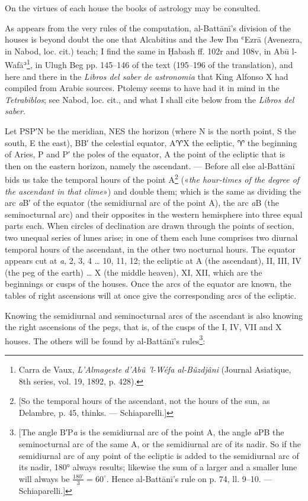 \documentclass[11pt]{article}
\begin{document}
\par On the virtues of each house the books of astrology may be consulted.\par
\par As appears from the very rules of the computation, al-Battānī's division of the houses is beyond doubt the one that Alcabitius and the Jew Ibn ʿEzrā (Avenezra, in Nabod, loc. cit.) teach; I find the same in Ḥabash ff. 102r and 108v, in Abū l-Wafāʾ\footnote{Carra de Vaux, \emph{L’Almageste d’Abû ’l-Wéfa al-Bûzdjâni} (Journal Asiatique, 8th series, vol. 19, 1892, p. 428).}, in Ulugh Beg pp. 145–146 of the text (195–196 of the translation), and here and there in the \emph{Libros del saber de astronomia} that King Alfonso X had compiled from Arabic sources. Ptolemy seems to have had it in mind in the \emph{Tetrabiblos}; see Nabod, loc. cit., and what I shall cite below from the \emph{Libros del saber}.\par
\begin{center}\end{center}
\par Let PSP′N be the meridian, NES the horizon (where N is the north point, S the south, E the east), BB′ the celestial equator, A{\MoonFont\upshape ♈}X the ecliptic, {\MoonFont\upshape ♈} the beginning of Aries, P and P′ the poles of the equator, A the point of the ecliptic that is then on the eastern horizon, namely the ascendant. — Before all else al-Battānī bids us take the temporal hours of the point A\footnote{[So the temporal hours of the ascendant, not the hours of the sun, as Delambre, p. 45, thinks. — Schiaparelli.]} («\emph{the hour-times of the degree of the ascendant in that clime}») and double them; which is the same as dividing the arc \emph{a}B′ of the equator (the semidiurnal arc of the point A), the arc \emph{a}B (the seminocturnal arc) and their opposites in the western hemisphere into three equal parts each. When circles of declination are drawn through the points of section, two unequal series of lunes arise; in one of them each lune comprises two diurnal temporal hours of the ascendant, in the other two nocturnal hours. The equator appears cut at \emph{a}, 2, 3, 4 … 10, 11, 12; the ecliptic at A (the ascendant), II, III, IV (the peg of the earth) … X (the middle heaven), XI, XII, which are the beginnings or cusps of the houses. Once the arcs of the equator are known, the tables of right ascensions will at once give the corresponding arcs of the ecliptic.\par
\par Knowing the semidiurnal and seminocturnal arcs of the ascendant is also knowing the right ascensions of the pegs, that is, of the cusps of the I, IV, VII and X houses. The others will be found by al-Battānī's rules\footnote{[The angle B′P\emph{a} is the semidiurnal arc of the point A, the angle \emph{a}PB the seminocturnal arc of the same A, or the semidiurnal arc of its nadir. So if the semidiurnal arc of any point of the ecliptic is added to the semidiurnal arc of its nadir, 180° always results; likewise the sum of a larger and a smaller lune will always be $\frac{180^\circ}{3} = 60^\circ$. Hence al-Battānī's rule on p. 74, ll. 9–10. — Schiaparelli.]}:\par
\end{document}
